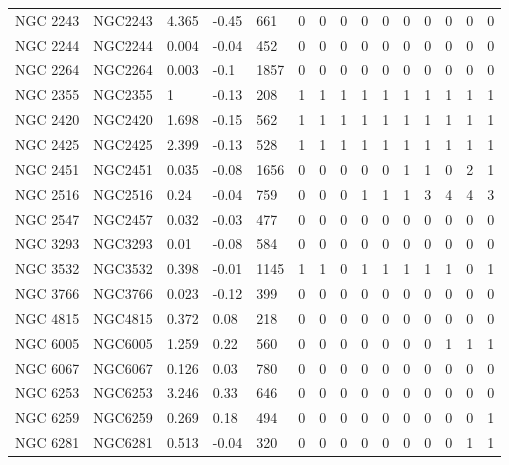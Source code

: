 \documentclass[fleqn,usenatbib]{mnras}
\begin{document}
\begin{table}
\begin{tabular}{|l l l l l || c c c c c | c c c c c|}
            NGC 2243 & NGC2243 & 4.365 & -0.45 & 661 & 0 & 0 & 0 & 0 & 0 & 0 & 0 & 0 & 0 & 0\\
            NGC 2244 & NGC2244 & 0.004 & -0.04 & 452 & 0 & 0 & 0 & 0 & 0 & 0 & 0 & 0 & 0 & 0\\
            NGC 2264 & NGC2264 & 0.003 & -0.1 & 1857 & 0 & 0 & 0 & 0 & 0 & 0 & 0 & 0 & 0 & 0\\
            \rowcolor{lightgray}
            NGC 2355 & NGC2355 & 1 & -0.13 & 208 & 1 & 1 & 1 & 1 & 1 & 1 & 1 & 1 & 1 & 1\\
            \rowcolor{lightgray}
            NGC 2420 & NGC2420 & 1.698 & -0.15 & 562 & 1 & 1 & 1 & 1 & 1 & 1 & 1 & 1 & 1 & 1\\
            \rowcolor{lightgray}
            NGC 2425 & NGC2425 & 2.399 & -0.13 & 528 & 1 & 1 & 1 & 1 & 1 & 1 & 1 & 1 & 1 & 1\\
            \rowcolor{lightgray}
            NGC 2451 & NGC2451 & 0.035 & -0.08 & 1656 & 0 & 0 & 0 & 0 & 0 & 1 & 1 & 0 & 2 & 1\\
            \rowcolor{lightgray}
            NGC 2516 & NGC2516 & 0.24 & -0.04 & 759 & 0 & 0 & 0 & 1 & 1 & 1 & 3 & 4 & 4 & 3\\
            NGC 2547 & NGC2457 & 0.032 & -0.03 & 477 & 0 & 0 & 0 & 0 & 0 & 0 & 0 & 0 & 0 & 0\\
            NGC 3293 & NGC3293 & 0.01 & -0.08 & 584 & 0 & 0 & 0 & 0 & 0 & 0 & 0 & 0 & 0 & 0\\
            \rowcolor{lightgray}
            NGC 3532 & NGC3532 & 0.398 & -0.01 & 1145 & 1 & 1 & 0 & 1 & 1 & 1 & 1 & 1 & 0 & 1\\
            NGC 3766 & NGC3766 & 0.023 & -0.12 & 399 & 0 & 0 & 0 & 0 & 0 & 0 & 0 & 0 & 0 & 0\\
            NGC 4815 & NGC4815 & 0.372 & 0.08 & 218 & 0 & 0 & 0 & 0 & 0 & 0 & 0 & 0 & 0 & 0\\
            \rowcolor{lightgray}
            NGC 6005 & NGC6005 & 1.259 & 0.22 & 560 & 0 & 0 & 0 & 0 & 0 & 0 & 0 & 1 & 1 & 1\\
            NGC 6067 & NGC6067 & 0.126 & 0.03 & 780 & 0 & 0 & 0 & 0 & 0 & 0 & 0 & 0 & 0 & 0\\
            NGC 6253 & NGC6253 & 3.246 & 0.33 & 646 & 0 & 0 & 0 & 0 & 0 & 0 & 0 & 0 & 0 & 0\\
            \rowcolor{lightgray}
            NGC 6259 & NGC6259 & 0.269 & 0.18 & 494 & 0 & 0 & 0 & 0 & 0 & 0 & 0 & 0 & 0 & 1\\
            \rowcolor{lightgray}
            NGC 6281 & NGC6281 & 0.513 & -0.04 & 320 & 0 & 0 & 0 & 0 & 0 & 0 & 0 & 0 & 1 & 1\\

\end{tabular}
\end{table}
\end{document}

